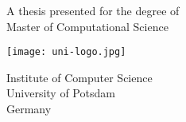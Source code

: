 \begin{titlepage}
\begin{center}
\vspace*{5ex}

\Huge
\textbf{\thetitle}


\vspace{5ex}

\LARGE
\textbf{\theauthor}

\vfill

A thesis presented for the degree of\\
Master of Computational Science

\vspace{10ex}

\texttt{[image: uni-logo.jpg]}

\vspace{3ex}

\Large
Institute of Computer Science\\
University of Potsdam\\
Germany\\
\thedate

\vspace*{5ex}

\end{center}
\end{titlepage}
